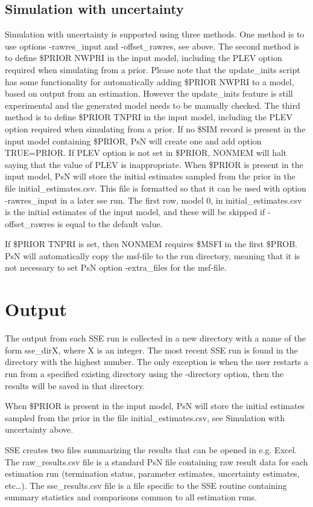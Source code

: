 \subsection{Simulation with uncertainty}
Simulation with uncertainty is supported using three methods. One method is to use options -rawres\_input and -offset\_rawres, see above. The second method is to define \$PRIOR NWPRI in the input model, including the PLEV option required when simulating from a prior. Please note that the update\_inits script has some functionality for automatically adding \$PRIOR NWPRI to a model, based on output from an estimation. However the update\_inits feature is still experimental and the generated model needs to be manually checked. The third method is to define \$PRIOR TNPRI in the input model, including the PLEV option required when simulating from a prior. If no \$SIM record is present in the input model containing \$PRIOR, PsN will create one and add option TRUE=PRIOR. If PLEV option is not set in \$PRIOR, NONMEM will halt saying that the value of PLEV is inappropriate. When \$PRIOR is present in the input model, PsN will store the initial estimates sampled from the prior in the file initial\_estimates.csv. This file is formatted so that it can be used with option -rawres\_input in a later sse run. The first row, model 0, in initial\_estimates.csv is the initial estimates of the input model, and these will be skipped if -offset\_rawres is equal to the default value.

If \$PRIOR TNPRI is set, then NONMEM requires \$MSFI in the first \$PROB. PsN will automatically copy the msf-file to the run directory, meaning that it is not necessary to set PsN option -extra\_files for the msf-file.

\section{Output}
The output from each SSE run is collected in a new directory with a name of the form sse\_dirX, where X is an integer. The most recent SSE run is found in the directory with the highest number. The only exception is when the user restarts a run from a specified existing directory using the -directory option, then the results will be saved in that directory. 

When \$PRIOR is present in the input model, PsN will store the initial estimates sampled from the prior in the file initial\_estimates.csv, see Simulation with uncertainty above.

SSE creates two files summarizing the results that can be opened in e.g. Excel. The raw\_results.csv file is a standard PsN file containing raw result data for each estimation run (termination status, parameter estimates, uncertainty estimates, etc…). The sse\_results.csv file is a file specific to the SSE routine containing summary statistics and comparisons common to all estimation runs. 

